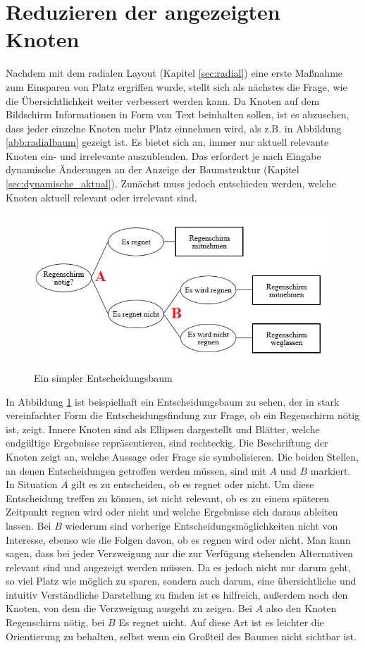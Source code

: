\section{Reduzieren der angezeigten Knoten}\label{sec:reduzieren}
Nachdem mit dem radialen Layout (Kapitel \ref{sec:radial}) eine erste Maßnahme zum Einsparen von Platz ergriffen wurde, stellt sich als nächstes die Frage, wie die Übersichtlichkeit weiter verbessert werden kann. Da Knoten auf dem Bildschirm Informationen in Form von Text beinhalten sollen, ist es abzusehen, dass jeder einzelne Knoten mehr Platz einnehmen wird, als z.B. in Abbildung \ref{abb:radialbaum} gezeigt ist. Es bietet sich an, immer nur aktuell relevante Knoten ein- und irrelevante auszublenden. Das erfordert je nach Eingabe dynamische Änderungen an der Anzeige der Baumstruktur (Kapitel \ref{sec:dynamische_aktual}). Zunächst muss jedoch entschieden werden, welche Knoten aktuell relevant oder irrelevant sind. 
\begin{figure}
	\centering
	\includegraphics[width=\linewidth]{../screenshots/entscheidungsbaum_bsp.PNG}
	\caption{Ein simpler Entscheidungsbaum}
	\label{abb:entsch_baum_bsp}
\end{figure}
In Abbildung \ref{abb:entsch_baum_bsp} ist beispielhaft ein Entscheidungsbaum zu sehen, der in stark vereinfachter Form die Entscheidungsfindung zur Frage, ob ein Regenschirm nötig ist, zeigt. Innere Knoten sind als Ellipsen dargestellt und Blätter, welche endgültige Ergebnisse repräsentieren, sind rechteckig. Die Beschriftung der Knoten zeigt an, welche Aussage oder Frage sie symbolisieren. Die beiden Stellen, an denen Entscheidungen getroffen werden müssen, sind mit $A$ und $B$ markiert. In Situation $A$ gilt es zu entscheiden, ob es regnet oder nicht. Um diese Entscheidung treffen zu können, ist nicht relevant, ob es zu einem späteren Zeitpunkt regnen wird oder nicht und welche Ergebnisse sich daraus ableiten lassen. Bei $B$ wiederum sind vorherige Entscheidungsmöglichkeiten nicht von Interesse, ebenso wie die Folgen davon, ob es regnen wird oder nicht. Man kann sagen, dass bei jeder Verzweigung nur die zur Verfügung stehenden Alternativen relevant sind und angezeigt werden müssen. Da es jedoch nicht nur darum geht, so viel Platz wie möglich zu sparen, sondern auch darum, eine übersichtliche und intuitiv Verständliche Darstellung zu finden ist es hilfreich, außerdem noch den Knoten, von dem die Verzweigung ausgeht zu zeigen. Bei $A$ also den Knoten \glqq Regenschirm nötig\grqq , bei $B$ \glqq Es regnet nicht\grqq . Auf diese Art ist es leichter die Orientierung zu behalten, selbst wenn ein Großteil des Baumes nicht sichtbar ist.

